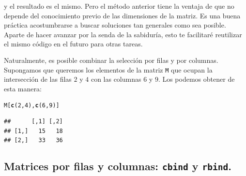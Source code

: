 \documentclass[10pt,a4paper]{article}\usepackage[]{graphicx}\usepackage[]{color}
\makeatletter
\newcommand{\hlnum}[1]{\textcolor[rgb]{0.686,0.059,0.569}{#1}}%
\newcommand{\hlstd}[1]{\textcolor[rgb]{0.345,0.345,0.345}{#1}}%
\newcommand{\hlkwd}[1]{\textcolor[rgb]{0.737,0.353,0.396}{\textbf{#1}}}%
\newenvironment{kframe}{%
 \def\at@end@of@kframe{}%
 \ifinner\ifhmode%
  \def\at@end@of@kframe{\end{minipage}}%
  \begin{minipage}{\columnwidth}%
 \fi\fi%
 \def\FrameCommand##1{\hskip\@totalleftmargin \hskip-\fboxsep
 \colorbox{shadecolor}{##1}\hskip-\fboxsep
     \hskip-\linewidth \hskip-\@totalleftmargin \hskip\columnwidth}%
 \MakeFramed {\advance\hsize-\width
   \@totalleftmargin\z@ \linewidth\hsize
   \@setminipage}}%
 {\par\unskip\endMakeFramed%
 \at@end@of@kframe}
\newenvironment{knitrout}{}{} %
\makeatother
\begin{document}
y el resultado es el mismo. Pero el método anterior tiene la ventaja de que no depende del conocimiento previo de las dimensiones de la matriz. Es una buena práctica acostumbrarse a buscar soluciones tan generales como sea posible. Aparte de hacer avanzar por la senda de la sabiduría, esto te facilitaré reutilizar el mismo código en el futuro para otras tareas.

Naturalmente, es posible combinar la selección por filas y por columnas. Supongamos que queremos los elementos de la matriz {\tt M} que ocupan la intersección de las filas $2$ y $4$ con las columnas $6$ y $9$. Los podemos obtener de esta manera:
\begin{knitrout}
\color{fgcolor}\begin{kframe}
\begin{alltt}
    \hlstd{M[} \hlkwd{c}\hlstd{(}\hlnum{2}\hlstd{,} \hlnum{4}\hlstd{),} \hlkwd{c}\hlstd{(}\hlnum{6}\hlstd{,} \hlnum{9}\hlstd{)]}
\end{alltt}
\begin{verbatim}
##      [,1] [,2]
## [1,]   15   18
## [2,]   33   36
\end{verbatim}
\end{kframe}
\end{knitrout}

\subsection{Matrices por filas y columnas: {\tt cbind} y {\tt rbind}.}
\label{tut03:subsec:RbindCbind}
\end{document}
